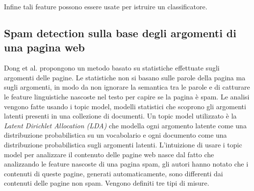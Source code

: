 Infine tali feature possono essere usate per istruire un classificatore.

\subsection{Spam detection sulla base degli argomenti di una pagina web}
Dong et al. \cite{Dong:2012:EDC:2457524.2457693} propongono un metodo basato su statistiche effettuate sugli argomenti delle pagine. Le statistiche non si basano sulle parole della pagina ma sugli argomenti, in modo da non ignorare la semantica tra le parole e di catturare le feature linguistiche nascoste nel testo per capire se la pagina è spam. Le analisi vengono fatte usando i topic model, modelli statistici che scoprono gli argomenti latenti presenti in una collezione di documenti. Un topic model utilizzato è la \textit{Latent Dirichlet Allocation (LDA)} che modella ogni argomento latente come una distribuzione probabilistica su un vocabolario e ogni documento come una distribuzione probabilistica sugli argomenti latenti. L'intuizione di usare i topic model per analizzare il contenuto  delle pagine web nasce dal fatto che analizzando le feature nascoste di una pagina spam, gli autori hanno notato che i contenuti di queste pagine, generati automaticamente, sono differenti dai contenuti delle pagine non 
spam. Vengono definiti tre tipi di misure.

